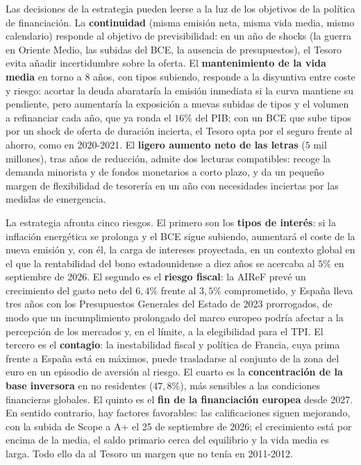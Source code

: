 \documentclass[10pt,a4paper]{article}
\begin{document}
Las decisiones de la estrategia pueden leerse a la luz de los objetivos de la política de financiación. La \textbf{continuidad} (misma emisión neta, misma vida media, mismo calendario) responde al objetivo de previsibilidad: en un año de shocks (la guerra en Oriente Medio, las subidas del BCE, la ausencia de presupuestos), el Tesoro evita añadir incertidumbre sobre la oferta. El \textbf{mantenimiento de la vida media} en torno a $8$ años, con tipos subiendo, responde a la disyuntiva entre coste y riesgo: acortar la deuda abarataría la emisión inmediata si la curva mantiene su pendiente, pero aumentaría la exposición a nuevas subidas de tipos y el volumen a refinanciar cada año, que ya ronda el $16\%$ del PIB; con un BCE que sube tipos por un shock de oferta de duración incierta, el Tesoro opta por el seguro frente al ahorro, como en 2020-2021. El \textbf{ligero aumento neto de las letras} ($5$ mil millones), tras años de reducción, admite dos lecturas compatibles: recoge la demanda minorista y de fondos monetarios a corto plazo, y da un pequeño margen de flexibilidad de tesorería en un año con necesidades inciertas por las medidas de emergencia.

La estrategia afronta cinco riesgos. El primero son los \textbf{tipos de interés}: si la inflación energética se prolonga y el BCE sigue subiendo, aumentará el coste de la nueva emisión y, con él, la carga de intereses proyectada, en un contexto global en el que la rentabilidad del bono estadounidense a diez años se acercaba al $5\%$ en septiembre de 2026. El segundo es el \textbf{riesgo fiscal}: la AIReF prevé un crecimiento del gasto neto del $6,4\%$ frente al $3,5\%$ comprometido, y España lleva tres años con los Presupuestos Generales del Estado de 2023 prorrogados, de modo que un incumplimiento prolongado del marco europeo podría afectar a la percepción de los mercados y, en el límite, a la elegibilidad para el TPI. El tercero es el \textbf{contagio}: la inestabilidad fiscal y política de Francia, cuya prima frente a España está en máximos, puede trasladarse al conjunto de la zona del euro en un episodio de aversión al riesgo. El cuarto es la \textbf{concentración de la base inversora} en no residentes ($47,8\%$), más sensibles a las condiciones financieras globales. El quinto es el \textbf{fin de la financiación europea} desde 2027. En sentido contrario, hay factores favorables: las calificaciones siguen mejorando, con la subida de Scope a A+ el 25 de septiembre de 2026; el crecimiento está por encima de la media, el saldo primario cerca del equilibrio y la vida media es larga. Todo ello da al Tesoro un margen que no tenía en 2011-2012.
\end{document}
